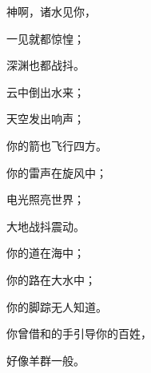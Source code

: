 {\BB \par }{\Q {}神啊，诸水见你，
\par }{\Q 一见就都惊惶；
\par }{\Q 深渊也都战抖。
\par }{\Q {}云中倒出水来；
\par }{\Q 天空发出响声；
\par }{\Q 你的箭也飞行四方。
\par }{\Q {}你的雷声在旋风中；
\par }{\Q 电光照亮世界；
\par }{\Q 大地战抖震动。
\par }{\Q {}你的道在海中；
\par }{\Q 你的路在大水中；
\par }{\Q 你的脚踪无人知道。
\par }{\Q {}你曾借{}和{}的手引导你的百姓，
\par }{\Q 好像羊群一般。

}
